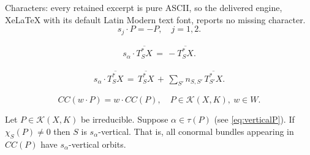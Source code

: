 \documentclass[10pt,a4paper]{amsart}
\begin{document}
Characters: every retained excerpt is pure ASCII, so the delivered engine, XeLaTeX with its default Latin Modern text font, reports no missing character.
\begin{equation}\label{eq:verticalP}
s_{j} \cdot P=-P, \quad j = 1,2.
\end{equation}

\begin{align}\label{eq:vertical}
s_\alpha\cdot \overline{T_S^{\ast}X}\, =\, -{\overline{T_S^{\ast}X}}. 
\end{align}

\begin{align}\label{eq:horizontal}
s_{\alpha} \cdot \overline{T^{*}_{S}X}\, =\, \overline{T^{*}_{S}X}\, +\, 
\sum_{S'}n_{S,S'} \, \overline{T^{*}_{S'}X}.
\end{align}

\begin{equation}\label{eq:W-equivariant}
CC(w\cdot P)=w\cdot CC(P), \quad P\in \mathscr{K}(X,K), \ w\in W.
\end{equation}

\begin{prop}\label{prop:CC2}
Let $P \in \mathscr{K}(X,K)$ be irreducible.
Suppose $\alpha \in \tau (P)$ (see \eqref{eq:verticalP}). If 
$\chi_{S} (P) \neq 0$ then $S$ is $s_\alpha$-vertical. 
That is, all conormal bundles appearing in ${CC}(P)$ have
$s_\alpha$-vertical orbits. 
\end{prop}
\end{document}
